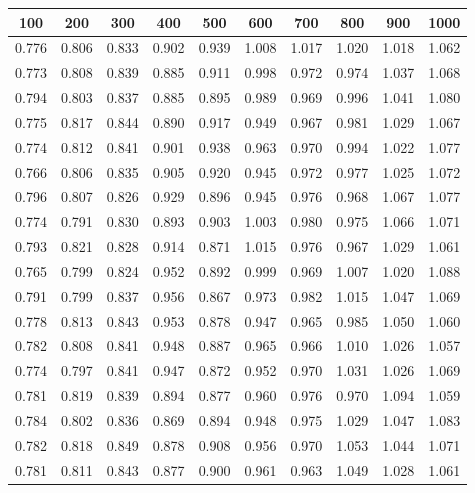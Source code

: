   \begin{table}[!ht]
    \centering
    \begin{tabular}{|c|c|c|c|c|c|c|c|c|c|}
      \hline
      100 & 200 & 300 & 400 & 500 & 600 & 700 & 800 & 900 & 1000 \\ \hline\hline
      0.776 & 0.806 & 0.833 & 0.902 & 0.939 & 1.008 & 1.017 & 1.020 & 1.018 & 1.062 \\ \hline
      0.773 & 0.808 & 0.839 & 0.885 & 0.911 & 0.998 & 0.972 & 0.974 & 1.037 & 1.068 \\ \hline
      0.794 & 0.803 & 0.837 & 0.885 & 0.895 & 0.989 & 0.969 & 0.996 & 1.041 & 1.080 \\ \hline
      0.775 & 0.817 & 0.844 & 0.890 & 0.917 & 0.949 & 0.967 & 0.981 & 1.029 & 1.067 \\ \hline
      0.774 & 0.812 & 0.841 & 0.901 & 0.938 & 0.963 & 0.970 & 0.994 & 1.022 & 1.077 \\ \hline
      0.766 & 0.806 & 0.835 & 0.905 & 0.920 & 0.945 & 0.972 & 0.977 & 1.025 & 1.072 \\ \hline
      0.796 & 0.807 & 0.826 & 0.929 & 0.896 & 0.945 & 0.976 & 0.968 & 1.067 & 1.077 \\ \hline
      0.774 & 0.791 & 0.830 & 0.893 & 0.903 & 1.003 & 0.980 & 0.975 & 1.066 & 1.071 \\ \hline
      0.793 & 0.821 & 0.828 & 0.914 & 0.871 & 1.015 & 0.976 & 0.967 & 1.029 & 1.061 \\ \hline
      0.765 & 0.799 & 0.824 & 0.952 & 0.892 & 0.999 & 0.969 & 1.007 & 1.020 & 1.088 \\ \hline
      0.791 & 0.799 & 0.837 & 0.956 & 0.867 & 0.973 & 0.982 & 1.015 & 1.047 & 1.069 \\ \hline
      0.778 & 0.813 & 0.843 & 0.953 & 0.878 & 0.947 & 0.965 & 0.985 & 1.050 & 1.060 \\ \hline
      0.782 & 0.808 & 0.841 & 0.948 & 0.887 & 0.965 & 0.966 & 1.010 & 1.026 & 1.057 \\ \hline
      0.774 & 0.797 & 0.841 & 0.947 & 0.872 & 0.952 & 0.970 & 1.031 & 1.026 & 1.069 \\ \hline
      0.781 & 0.819 & 0.839 & 0.894 & 0.877 & 0.960 & 0.976 & 0.970 & 1.094 & 1.059 \\ \hline
      0.784 & 0.802 & 0.836 & 0.869 & 0.894 & 0.948 & 0.975 & 1.029 & 1.047 & 1.083 \\ \hline
      0.782 & 0.818 & 0.849 & 0.878 & 0.908 & 0.956 & 0.970 & 1.053 & 1.044 & 1.071 \\ \hline
      0.781 & 0.811 & 0.843 & 0.877 & 0.900 & 0.961 & 0.963 & 1.049 & 1.028 & 1.061 \\ \hline

\end{tabular}
\end{table}
